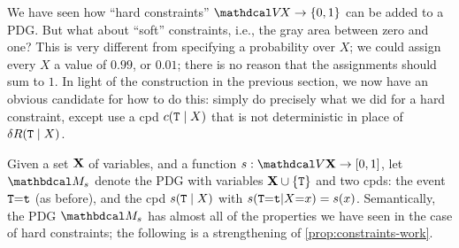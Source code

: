 We have seen how ``hard constraints''  $\V\!X \to \{0, 1\}$ can be added to a PDG.
But what about ``soft'' constraints, i.e., the gray area between zero and one? 
%
This is very different from specifying a probability over $X$; we could assign every $X$ a value of $0.99$, or $0.01$; there is no reason that the assignments should sum to $1$.
%
In light of the construction in the previous section, we now have an obvious candidate for how to do this: simply do precisely what we did for a hard constraint, except use a cpd $c({\tt T} \mid X)$ that is not deterministic in place of $\delta R({\tt T}\mid X)$. 


Given a set $\mathbf X$ of variables, and a function
$s : \V\mat X \to [0,1]$, let $\dg M_s$ denote the PDG with variables 
    $\mathbf X \cup \{ {\tt T}\}$ 
    and two cpds:
    the event ${\tt T}{=}{\tt t}$ (as before),
    and the cpd 
    $s({\tt T} \mid X)$ with $s({\tt T}{=}{\tt t}|X{=}x) = s(x)$.
Semantically, the PDG $\dg M_s$ has almost all of the properties we have seen in the case of hard constraints; the following is a strengthening of \cref{prop:constraints-work}. 

